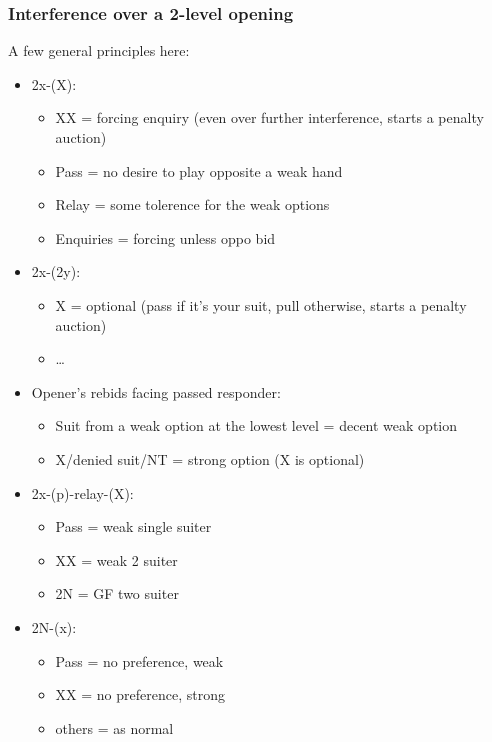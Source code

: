 \documentclass[a4paper,14pt]{extarticle}
\begin{document}
\newpage
\subsubsection{Interference over a 2-level opening}
\label{sec:intf:2level}

A few general principles here:

\begin{itemize}
\item 2x-(X):
   \begin{itemize}
      \item XX = forcing enquiry (even over further interference, starts a penalty auction)
      \item Pass = no desire to play opposite a weak hand
      \item Relay = some tolerence for the weak options
      \item Enquiries = forcing unless oppo bid
   \end{itemize}
\item 2x-(2y):
   \begin{itemize}
      \item X = optional (pass if it's your suit, pull otherwise, starts a penalty auction)
      \item \ldots
   \end{itemize}
\item Opener's rebids facing passed responder:
   \begin{itemize}
   \item Suit from a weak option at the lowest level = decent weak option
   \item X/denied suit/NT = strong option (X is optional)
   \end{itemize}
\item 2x-(p)-relay-(X):
   \begin{itemize}
	\item Pass = weak single suiter
	\item XX = weak 2 suiter
	\item 2N = GF two suiter
   \end{itemize}
\item 2N-(x):
   \begin{itemize}
	\item Pass = no preference, weak
	\item XX = no preference, strong
	\item others = as normal
   \end{itemize}
\end{itemize}
\end{document}
